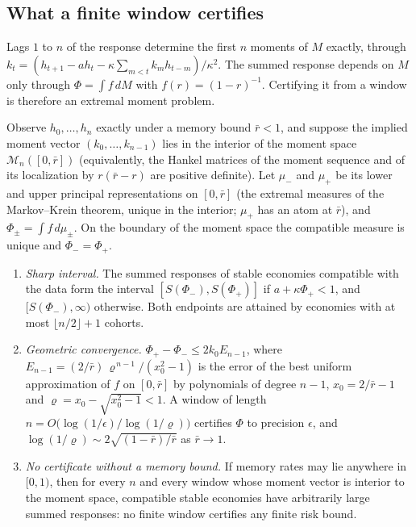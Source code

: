 \subsection{What a finite window certifies}

Lags $1$ to $n$ of the response determine the first $n$ moments of $M$ exactly, through $k_t=(h_{t+1}-ah_t-\kappa\sum_{m<t}k_mh_{t-m})/\kappa^2$. The summed response depends on $M$ only through $\Phi=\int f\,dM$ with $f(r)=(1-r)^{-1}$. Certifying it from a window is therefore an extremal moment problem.

\begin{theorem}\label{p2:thm:window}
Observe $h_0,\ldots,h_n$ exactly under a memory bound $\bar r<1$, and suppose the implied moment vector $(k_0,\ldots,k_{n-1})$ lies in the interior of the moment space $\mathcal M_n([0,\bar r])$ (equivalently, the Hankel matrices of the moment sequence and of its localization by $r(\bar r-r)$ are positive definite). Let $\mu_-$ and $\mu_+$ be its lower and upper principal representations on $[0,\bar r]$ (the extremal measures of the Markov--Krein theorem, unique in the interior; $\mu_+$ has an atom at $\bar r$), and $\Phi_\pm=\int f\,d\mu_\pm$. On the boundary of the moment space the compatible measure is unique and $\Phi_-=\Phi_+$.
\begin{enumerate}[label=(\roman*)]
\item \emph{Sharp interval.} The summed responses of stable economies compatible with the data form the interval $[S(\Phi_-),S(\Phi_+)]$ if $a+\kappa\Phi_+<1$, and $[S(\Phi_-),\infty)$ otherwise. Both endpoints are attained by economies with at most $\lfloor n/2\rfloor+1$ cohorts.
\item \emph{Geometric convergence.} $\Phi_+-\Phi_-\le2k_0E_{n-1}$, where $E_{n-1}=(2/\bar r)\,\varrho^{\,n-1}/(x_0^2-1)$ is the error of the best uniform approximation of $f$ on $[0,\bar r]$ by polynomials of degree $n-1$, $x_0=2/\bar r-1$ and $\varrho=x_0-\sqrt{x_0^2-1}<1$. A window of length $n=O\bigl(\log(1/\epsilon)/\log(1/\varrho)\bigr)$ certifies $\Phi$ to precision $\epsilon$, and $\log(1/\varrho)\sim2\sqrt{(1-\bar r)/\bar r}$ as $\bar r\to1$.
\item \emph{No certificate without a memory bound.} If memory rates may lie anywhere in $[0,1)$, then for every $n$ and every window whose moment vector is interior to the moment space, compatible stable economies have arbitrarily large summed responses: no finite window certifies any finite risk bound.
\end{enumerate}
\end{theorem}

